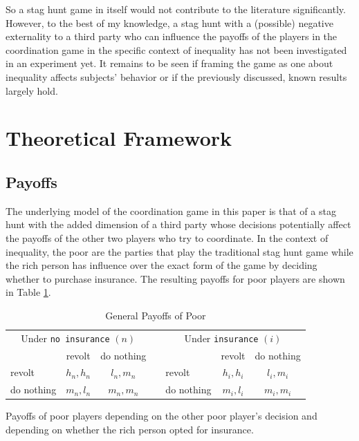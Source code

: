\documentclass[12pt]{article}
\begin{document}
	So a stag hunt game in itself would not contribute to the literature 
	significantly. However, to the best of my knowledge, a stag hunt with a 
	(possible) negative externality to a third party who can influence the 
	payoffs of the players in the coordination game  in the specific context of 
	inequality has not been investigated in an experiment yet. It remains to be 
	seen if framing the game as one about inequality affects subjects' behavior 
	or if the previously discussed, known results largely hold.
	
	
	\section{Theoretical Framework}
	\subsection{Payoffs}
	The underlying model of the coordination game in this paper is that of a 
	stag hunt with the added dimension of a third party whose decisions 
	potentially affect the payoffs of the other two players who try to 
	coordinate. In the context of inequality, the poor are the parties that 
	play the traditional stag hunt game while the rich person has influence 
	over the exact form of the game by deciding whether to purchase insurance. 
	The resulting payoffs for poor players are shown in Table 
	\ref{table:gpayoff}.
	
	\begin{table}[!htbp]
		\caption{General Payoffs of Poor}
		\label{table:gpayoff}
		\begin{center}
		\begin{tabular}{|l|c|c|c|l|c|c|}
			\multicolumn{3}{c}{Under \texttt{no insurance} $(n)$} &
			\multicolumn{1}{c}{} &
			\multicolumn{3}{c}{Under \texttt{insurance} $(i)$}\\
			\cline{1-3}\cline{5-7}
			& revolt & do nothing & & & revolt & do nothing\\
			\cline{1-3}\cline{5-7}
			revolt & $h_n, h_n$ & $l_n, m_n$ && revolt & $h_i, h_i$ & $l_i, 
			m_i$\\
			\cline{1-3}\cline{5-7}
			do nothing & $m_n, l_n$ & $m_n, m_n$ && do nothing & $m_i, l_i$ & 
			$m_i, m_i$\\
			\cline{1-3}\cline{5-7}
		\end{tabular}
		\end{center}
		\footnotesize
		Payoffs of poor players depending on the other poor player's decision 
		and depending on whether the rich person opted for insurance. 
	\end{table}
	
\end{document}
